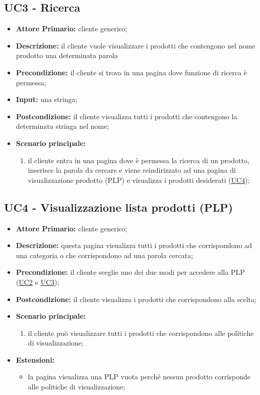 \subsection{UC3 - Ricerca}
\label{UC3}
\begin{itemize}
    \item \textbf{Attore Primario:} cliente generico;
    \item \textbf{Descrizione:} il cliente vuole visualizzare i prodotti che contengono nel nome prodotto una determinata parola
    \item \textbf{Precondizione:} il cliente si trova in una pagina dove funzione di ricerca è permessa;
    \item \textbf{Input:} una stringa;
    \item \textbf{Postcondizione:} il cliente visualizza tutti i prodotti che contengono la determinata stringa nel nome;
    \item \textbf{Scenario principale:}
    \begin{enumerate}
        \item il cliente entra in una pagina dove è permessa la ricerca di un prodotto, inserisce la parola da cercare e viene reindirizzato ad una pagina di visualizzazione prodotto (PLP) e visualizza i prodotti desiderati (\hyperref[UC4]{UC4});
    \end{enumerate}
\end{itemize}

\subsection{UC4 - Visualizzazione lista prodotti (PLP)}
\label{UC4}
\begin{itemize}
    \item \textbf{Attore Primario:} cliente generico;
    \item \textbf{Descrizione:} questa pagina visualizza tutti i prodotti che corrispondono ad una categoria o che corrispondono ad una parola cercata;
    \item \textbf{Precondizione:} il cliente sceglie uno dei due modi per accedere alla PLP (\hyperref[UC2]{UC2} e \hyperref[UC3]{UC3});
    \item \textbf{Postcondizione:} il cliente visualizza i prodotti che corrispondono alla scelta;
    \item \textbf{Scenario principale:}
    \begin{enumerate}
        \item il cliente può visualizzare tutti i prodotti che corrispondono alle politiche di visualizzazione;
    \end{enumerate}
    \item \textbf{Estensioni:}
    \begin{itemize}
        \item la pagina visualizza una PLP vuota perché nessun prodotto corrisponde alle politiche di visualizzazione;
    \end{itemize}
\end{itemize}


